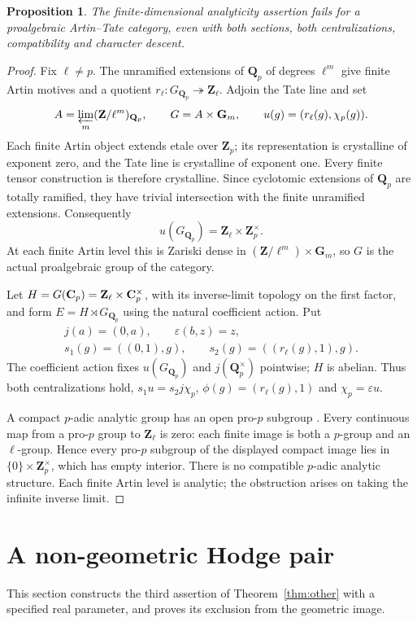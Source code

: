 \documentclass[11pt]{article}
\newtheorem{proposition}[theorem]{Proposition}
\theoremstyle{definition}\newtheorem{definition}[theorem]{Definition}
\theoremstyle{remark}\newtheorem{remark}[theorem]{Remark}
\newcommand{\Q}{\mathbf Q}\newcommand{\Z}{\mathbf Z}
\newcommand{\Gm}{\mathbf G_m}\newcommand{\B}{\mathrm B}\newcommand{\dR}{\mathrm{dR}}
\begin{document}
\begin{proposition}\label{prop:proalgebraic-local}
The finite-dimensional analyticity assertion fails for a proalgebraic Artin--Tate category, even with both sections, both centralizations, compatibility and character descent.
\end{proposition}
\begin{proof}
Fix $\ell\ne p$. The unramified extensions of $\Q_p$ of degrees $\ell^m$ give finite Artin motives and a quotient $r_\ell:G_{\Q_p}\twoheadrightarrow\Z_\ell$. Adjoin the Tate line and set
\[
 A=\varprojlim_m(\Z/\ell^m)_{\Q_p},\qquad
 G=A\times\Gm,\qquad u(g)=(r_\ell(g),\chi_p(g)).
\]
Each finite Artin object extends etale over $\Z_p$; its representation is crystalline of exponent zero, and the Tate line is crystalline of exponent one. Every finite tensor construction is therefore crystalline. Since cyclotomic extensions of $\Q_p$ are totally ramified, they have trivial intersection with the finite unramified extensions. Consequently
\[
                         u(G_{\Q_p})=\Z_\ell\times\Z_p^\times.
\]
At each finite Artin level this is Zariski dense in $(\Z/\ell^m)\times\Gm$, so $G$ is the actual proalgebraic group of the category.

Let $H=G(\C_p)=\Z_\ell\times\C_p^\times$, with its inverse-limit topology on the first factor, and form $E=H\rtimes G_{\Q_p}$ using the natural coefficient action. Put
\[
 \begin{gathered}
 j(a)=(0,a),\qquad\varepsilon(b,z)=z,\\
 s_1(g)=((0,1),g),\qquad
 s_2(g)=((r_\ell(g),1),g).
 \end{gathered}
\]
The coefficient action fixes $u(G_{\Q_p})$ and $j(\Q_p^\times)$ pointwise; $H$ is abelian. Thus both centralizations hold, $s_1u=s_2j\chi_p$, $\phi(g)=(r_\ell(g),1)$ and $\chi_p=\varepsilon u$.

A compact $p$-adic analytic group has an open pro-$p$ subgroup \cite[Theorem~19.11, p.~96]{PstragowskiLocal}. Every continuous map from a pro-$p$ group to $\Z_\ell$ is zero: each finite image is both a $p$-group and an $\ell$-group. Hence every pro-$p$ subgroup of the displayed compact image lies in $\{0\}\times\Z_p^\times$, which has empty interior. There is no compatible $p$-adic analytic structure. Each finite Artin level is analytic; the obstruction arises on taking the infinite inverse limit.
\end{proof}

\section{A non-geometric Hodge pair}
This section constructs the third assertion of Theorem~\ref{thm:other} with a specified real parameter, and proves its exclusion from the geometric image.
\end{document}

